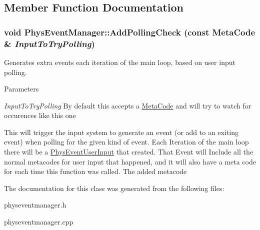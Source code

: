 \subsection{Member Function Documentation}
\hypertarget{classPhysEventManager_a1e99385441c5377a741561db581ef3ae}{
\subsubsection[{AddPollingCheck}]{\setlength{\rightskip}{0pt plus 5cm}void PhysEventManager::AddPollingCheck (const {\bf MetaCode} \& {\em InputToTryPolling})}}
\label{d5/dd7/classPhysEventManager_a1e99385441c5377a741561db581ef3ae}


Generates extra events each iteration of the main loop, based on user input polling. 
\begin{DoxyParams}{Parameters}
\item[{\em InputToTryPolling}]By default this accepts a \hyperlink{classMetaCode}{MetaCode} and will try to watch for occurences like this one\end{DoxyParams}
This will trigger the input system to generate an event (or add to an exiting event) when polling for the given kind of event. Each Iteration of the main loop there will be a \hyperlink{classPhysEventUserInput}{PhysEventUserInput} that created. That Event will Include all the normal metacodes for user input that happened, and it will also have a meta code for each time this function was called. The added metacode 

The documentation for this class was generated from the following files:\begin{DoxyCompactItemize}
\item 
physeventmanager.h\item 
physeventmanager.cpp\end{DoxyCompactItemize}
